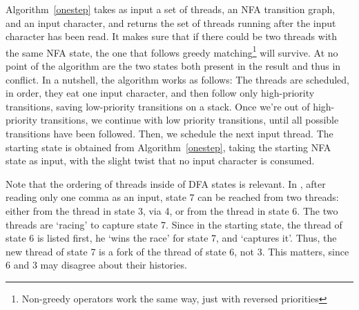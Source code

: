 \documentclass[english]{sigplanconf}
\theoremstyle{definition}
\begin{document}
Algorithm~\ref{onestep}  takes as input a set of threads, an NFA
transition graph, and an input character, and returns the set of
threads running after the input character has been read. It makes
sure that if there could be two threads with the same NFA state,
the one that follows greedy matching\footnote{Non-greedy operators
work the same way, just with reversed priorities} will survive. At
no point of the algorithm are the two states both present in the
result and thus in conflict. In a nutshell, the algorithm works as
follows: The threads are scheduled, in order, they eat one input
character, and then follow only high-priority transitions, saving
low-priority transitions on a stack.  Once we're out of high-priority
transitions, we continue with low priority transitions, until all
possible transitions have been followed. Then, we schedule the next
input thread.  The starting state is obtained from Algorithm~\ref{onestep},
taking the starting NFA state as input, with the slight twist that
no input character is consumed.

Note that the ordering of threads inside of DFA states is relevant.
In , after reading only one comma as an
input, state 7 can be reached from two threads: either from the
thread in state 3, via 4, or from the thread in state 6. The two
threads are `racing' to capture state 7. Since in the starting
state, the thread of state 6 is listed first, he `wins the race'
for state 7, and `captures it'. Thus, the new thread of state 7 is
a fork of the thread of state 6, not 3. This matters, since 6 and
3 may disagree about their histories.
\end{document}
